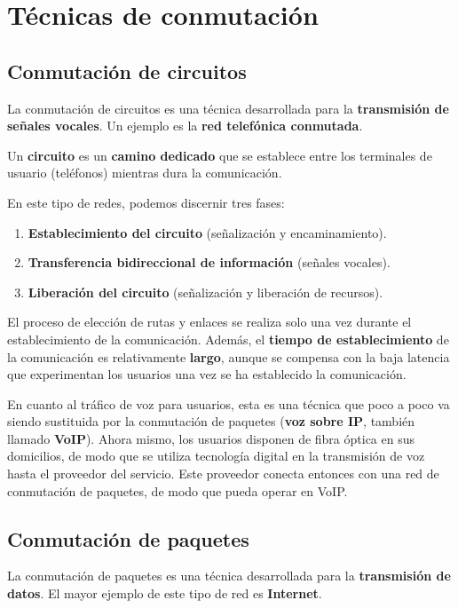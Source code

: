 \documentclass[a4paper]{book}
\numberwithin{figure}{chapter}
\numberwithin{equation}{subsection}
\begin{document}
\section{Técnicas de conmutación}
\subsection{Conmutación de circuitos}
La conmutación de circuitos es una técnica desarrollada para la \textbf{transmisión de señales vocales}. Un ejemplo es la \textbf{red telefónica conmutada}.

Un \textbf{circuito} es un \textbf{camino dedicado} que se establece entre los terminales de usuario (teléfonos) mientras dura la comunicación.

En este tipo de redes, podemos discernir tres fases:
\begin{enumerate}
  \item \textbf{Establecimiento del circuito} (señalización y encaminamiento).
  \item  \textbf{Transferencia bidireccional de información} (señales vocales).
  \item  \textbf{Liberación del circuito} (señalización y liberación de recursos).
\end{enumerate}

El proceso de elección de rutas y enlaces se realiza solo una vez durante el establecimiento de la comunicación. Además, el \textbf{tiempo de establecimiento} de la comunicación es relativamente \textbf{largo}, aunque se compensa con la baja latencia que experimentan los usuarios una vez se ha establecido la comunicación.

En cuanto al tráfico de voz para usuarios, esta es una técnica que poco a poco va siendo sustituida por la conmutación de paquetes (\textbf{voz sobre IP}, también llamado \textbf{VoIP}). Ahora mismo, los usuarios disponen de fibra óptica en sus domicilios, de modo que se utiliza tecnología digital en la transmisión de voz hasta el proveedor del servicio. Este proveedor conecta entonces con una red de conmutación de paquetes, de modo que pueda operar en VoIP.

\subsection{Conmutación de paquetes}
La conmutación de paquetes es una técnica desarrollada para la \textbf{transmisión de datos}. El mayor ejemplo de este tipo de red es \textbf{Internet}.
\end{document}
